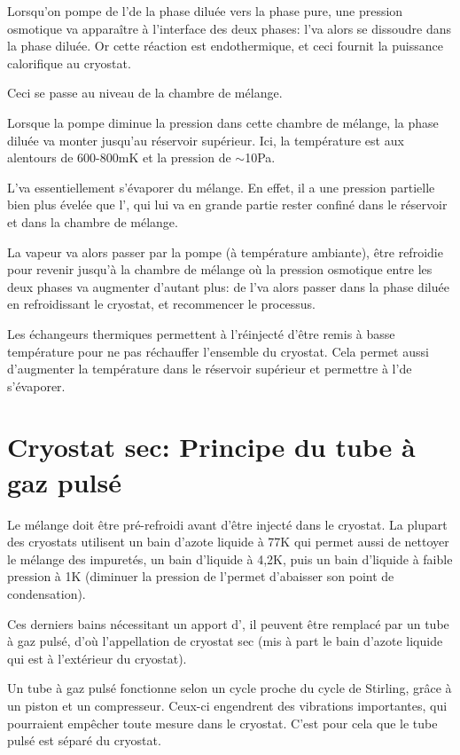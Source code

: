 Lorsqu'on pompe de l'\HeT de la phase diluée vers la phase pure, une pression osmotique va apparaître à l'interface des deux phases: l'\HeT va alors se dissoudre dans la phase diluée. Or cette réaction est endothermique, et ceci fournit la puissance calorifique au cryostat.

Ceci se passe au niveau de la chambre de mélange.\newline

Lorsque la pompe diminue la pression dans cette chambre de mélange, la phase diluée va monter jusqu'au réservoir supérieur. Ici, la température est aux alentours de 600-800mK et la pression de $\sim$10Pa.

L'\HeT va essentiellement s'évaporer du mélange. En effet, il a une pression partielle bien plus évelée que l'\HeQ, qui lui va en grande partie rester confiné dans le réservoir et dans la chambre de mélange.
\newline

La vapeur va alors passer par la pompe (à température ambiante), être refroidie pour revenir jusqu'à la chambre de mélange où la pression osmotique entre les deux phases va augmenter d'autant plus: de l'\HeT va alors passer dans la phase diluée en refroidissant le cryostat, et recommencer le processus. \newline

Les échangeurs thermiques permettent à l'\HeT réinjecté d'être remis à basse température pour ne pas réchauffer l'ensemble du cryostat. Cela permet aussi d'augmenter la température dans le réservoir supérieur et permettre à l'\HeT de s'évaporer.

\section{Cryostat sec: Principe du tube à gaz pulsé}
Le mélange doit être pré-refroidi avant d'être injecté dans le cryostat.\newline
La plupart des cryostats utilisent un bain d'azote liquide à 77K qui permet aussi de nettoyer le mélange des impuretés, un bain d'\HeQ liquide à 4,2K, puis un bain d'\HeQ liquide à faible pression à 1K (diminuer la pression de l'\HeQ permet d'abaisser son point de condensation).

Ces derniers bains nécessitant un apport d'\HeQ, il peuvent être remplacé par un tube à gaz pulsé, d'où l'appellation de cryostat sec (mis à part le bain d'azote liquide qui est à l'extérieur du cryostat).

Un tube à gaz pulsé fonctionne selon un cycle proche du cycle de Stirling, grâce à un piston et un compresseur. Ceux-ci engendrent des vibrations importantes, qui pourraient empêcher toute mesure dans le cryostat. C'est pour cela que le tube pulsé est séparé du cryostat.

